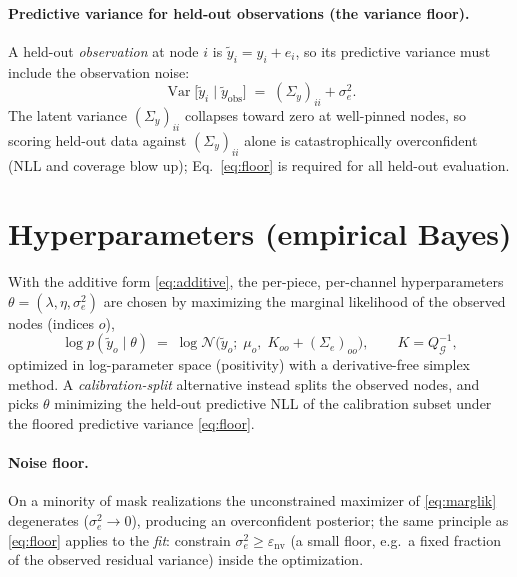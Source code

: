 \documentclass[11pt]{article}
\newcommand{\N}{\mathcal{N}}
\newcommand{\graph}{\mathcal{G}}
\newcommand{\Qg}{Q_{\graph}}
\begin{document}
\paragraph{Predictive variance for held-out observations (the variance floor).}
A held-out \emph{observation} at node $i$ is $\tilde y_i = y_i + e_i$, so its predictive
variance must include the observation noise:
\begin{equation}
  \operatorname{Var}\bigl[\tilde y_i \mid \tilde y_{\mathrm{obs}}\bigr]
  \;=\; (\Sigma_y)_{ii} + \sigma_e^2 .
  \label{eq:floor}
\end{equation}
The latent variance $(\Sigma_y)_{ii}$ collapses toward zero at well-pinned nodes, so
scoring held-out data against $(\Sigma_y)_{ii}$ alone is catastrophically overconfident
(NLL and coverage blow up); Eq.~\eqref{eq:floor} is required for all held-out evaluation.

\section{Hyperparameters (empirical Bayes)}
\label{sec:eb}

With the additive form \eqref{eq:additive}, the per-piece, per-channel hyperparameters
$\theta = (\lambda, \eta, \sigma_e^2)$ are chosen by maximizing the marginal likelihood of
the observed nodes (indices $o$),
\begin{equation}
  \log p(\tilde y_o \mid \theta)
  \;=\; \log \N\bigl(\tilde y_o;\; \mu_o,\; K_{oo} + (\Sigma_e)_{oo}\bigr),
  \qquad K = \Qg^{-1},
  \label{eq:marglik}
\end{equation}
optimized in log-parameter space (positivity) with a derivative-free simplex method. A
\emph{calibration-split} alternative instead splits the observed nodes, and picks $\theta$
minimizing the held-out predictive NLL of the calibration subset under the floored
predictive variance \eqref{eq:floor}.

\paragraph{Noise floor.}
On a minority of mask realizations the unconstrained maximizer of \eqref{eq:marglik}
degenerates ($\sigma_e^2 \to 0$), producing an overconfident posterior; the same principle
as \eqref{eq:floor} applies to the \emph{fit}: constrain $\sigma_e^2 \ge \varepsilon_{\mathrm{nv}}$
(a small floor, e.g.\ a fixed fraction of the observed residual variance) inside the
optimization.
\end{document}
